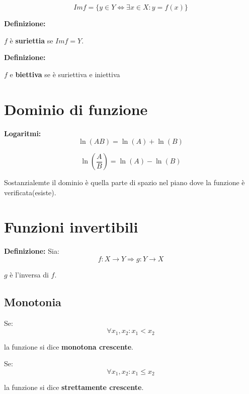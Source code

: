 \begin{equation*}
    Im f = \{y \in Y \Leftrightarrow \exists x \in X : y=f(x)\}
\end{equation*}

\textbf{Definizione:}

$f$ è \textbf{suriettia} se $Im f = Y$.

\textbf{Definizione:}

$f$ e \textbf{biettiva} se è suriettiva e iniettiva


\section{Dominio di funzione}

\textbf{Logaritmi:}
\begin{equation}
    \ln(AB) = \ln(A)+\ln(B)
\end{equation}

\begin{equation}
    \ln(\frac{A}{B}) = \ln(A)-\ln(B)
\end{equation}

Sostanzialemte il dominio è quella parte di spazio nel piano dove la funzione è verificata(esiste).



\section{Funzioni invertibili}
\textbf{Definizione:}
Sia:
\begin{equation*}
    f:X \rightarrow Y \Rightarrow g:Y\rightarrow X
\end{equation*} 

$g$ è l'inversa di $f$.

\subsection{Monotonia}

Se:
\begin{equation*}
    \forall x_1,x_2 : x_1<x_2
\end{equation*}

la funzione si dice \textbf{monotona crescente}.

Se: 
\begin{equation*}
    \forall x_1,x_2 : x_1 \leq x_2
\end{equation*}

la funzione si dice \textbf{strettamente crescente}.

